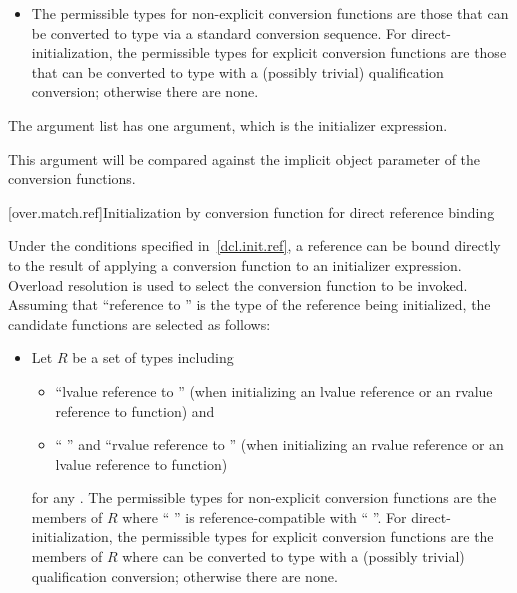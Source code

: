 \begin{itemize}
\item
The permissible types for non-explicit conversion functions are
those that can be converted to type 
via a standard conversion sequence.
For direct-initialization,
the permissible types for explicit conversion functions are
those that can be converted to type 
with a (possibly trivial) qualification conversion;
otherwise there are none.
\end{itemize}

\pnum
The argument list has one argument, which is the initializer expression.
\begin{note}
This argument will be compared against
the implicit object parameter of the conversion functions.
\end{note}

[over.match.ref]{Initialization by conversion function for direct reference binding}%

\pnum
Under the conditions specified in~\ref{dcl.init.ref}, a reference can be bound directly
to the result of applying a conversion
function to an initializer expression.
Overload resolution is used to select the
conversion function to be invoked.
Assuming that ``reference to  '' is the
type of the reference being initialized,
the candidate functions are selected as follows:
\begin{itemize}
\item
Let $R$ be a set of types including
\begin{itemize}
\item
``lvalue reference to  ''
(when initializing an lvalue reference or an rvalue reference to function) and
\item
`` ''
and ``rvalue reference to  '' (when initializing an
rvalue reference or an lvalue reference to function)
\end{itemize}
for any .
The permissible types for non-explicit conversion functions are
the members of $R$
where `` '' is reference-compatible
with `` ''.
For direct-initialization, the permissible types for explicit
conversion functions are the members of $R$
where  can be converted to type 
with a (possibly trivial) qualification conversion;
otherwise there are none.
\end{itemize}

